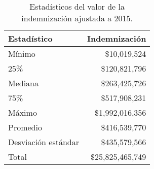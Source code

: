 \begin{table}[!htbp]
\centering
\caption{Estadísticos del valor de la indemnización ajustada a 2015.} 
\label{tab:indemnizacion}
\begin{tabular}{lr}
  \hline
Estadístico & Indemnización \\ 
  \hline
Mínimo & \$10,019,524 \\ 
  25\% & \$120,821,796 \\ 
  Mediana & \$263,425,726 \\ 
  75\% & \$517,908,231 \\ 
  Máximo & \$1,992,016,356 \\ 
  Promedio & \$416,539,770 \\ 
  Desviación estándar & \$435,579,566 \\ 
  Total & \$25,825,465,749 \\ 
   \hline
\end{tabular}
\end{table}
